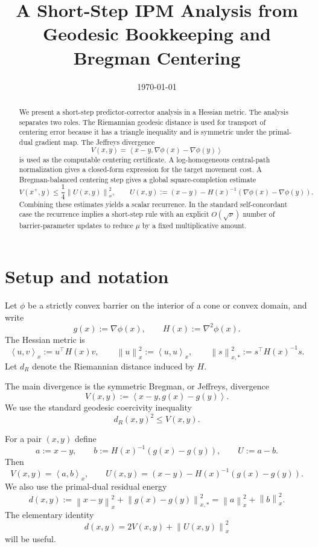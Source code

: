 \documentclass[11pt]{article}
\title{A Short-Step IPM Analysis from Geodesic Bookkeeping and Bregman Centering}
\author{}
\date{\today}
\newcommand{\ip}[2]{\left\langle #1,#2\right\rangle}
\newcommand{\norm}[1]{\left\|#1\right\|}
\newcommand{\distR}{d_R}
\newcommand{\grad}{\nabla}
\begin{document}
\maketitle

\begin{abstract}
We present a short-step predictor-corrector analysis in a Hessian metric.  The analysis separates two roles.  The Riemannian geodesic distance is used for transport of centering error because it has a triangle inequality and is symmetric under the primal-dual gradient map.  The Jeffreys divergence
\[
  V(x,y)=\ip{x-y}{\grad\phi(x)-\grad\phi(y)}
\]
is used as the computable centering certificate.  A log-homogeneous central-path normalization gives a closed-form expression for the target movement cost.  A Bregman-balanced centering step gives a global square-completion estimate
\[
  V(x^+,y)\le \frac14\norm{U(x,y)}_x^2,
  \qquad
  U(x,y):=(x-y)-H(x)^{-1}(\grad\phi(x)-\grad\phi(y)).
\]
Combining these estimates yields a scalar recurrence.  In the standard self-concordant case the recurrence implies a short-step rule with an explicit $O(\sqrt{\nu})$ number of barrier-parameter updates to reduce $\mu$ by a fixed multiplicative amount.
\end{abstract}

\section{Setup and notation}

Let $\phi$ be a strictly convex barrier on the interior of a cone or convex domain, and write
\[
  g(x):=\grad\phi(x),
  \qquad
  H(x):=\grad^2\phi(x).
\]
The Hessian metric is
\[
  \ip{u}{v}_x := u^\top H(x)v,
  \qquad
  \norm{u}_x^2:=\ip{u}{u}_x,
  \qquad
  \norm{s}_{x,*}^2:=s^\top H(x)^{-1}s.
\]
Let $\distR$ denote the Riemannian distance induced by $H$.

The main divergence is the symmetric Bregman, or Jeffreys, divergence
\[
  V(x,y):=\ip{x-y}{g(x)-g(y)}.
\]
We use the standard geodesic coercivity inequality
\begin{equation}
  \distR(x,y)^2\le V(x,y).        \label{eq:dist-lower}
\end{equation}

For a pair $(x,y)$ define
\begin{equation}
  a:=x-y,
  \qquad
  b:=H(x)^{-1}(g(x)-g(y)),
  \qquad
  U:=a-b.
\end{equation}
Then
\begin{equation}
  V(x,y)=\ip{a}{b}_x,
  \qquad
  U(x,y)=(x-y)-H(x)^{-1}(g(x)-g(y)).
\end{equation}
We also use the primal-dual residual energy
\begin{equation}
  d(x,y):=\norm{x-y}_x^2+\norm{g(x)-g(y)}_{x,*}^2
  =\norm{a}_x^2+\norm{b}_x^2.
\end{equation}
The elementary identity
\begin{equation}
  d(x,y)=2V(x,y)+\norm{U(x,y)}_x^2                   \label{eq:d-identity}
\end{equation}
will be useful.
\end{document}
